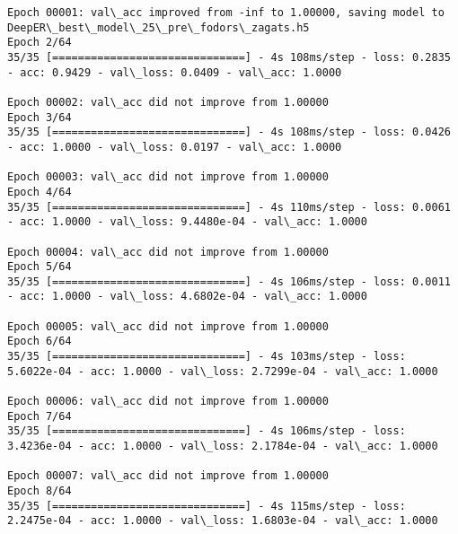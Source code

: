 \documentclass[11pt]{article}
\begin{document}
\begin{Verbatim}[commandchars=\\\{\}]
Epoch 00001: val\_acc improved from -inf to 1.00000, saving model to DeepER\_best\_model\_25\_pre\_fodors\_zagats.h5
Epoch 2/64
35/35 [==============================] - 4s 108ms/step - loss: 0.2835 - acc: 0.9429 - val\_loss: 0.0409 - val\_acc: 1.0000

Epoch 00002: val\_acc did not improve from 1.00000
Epoch 3/64
35/35 [==============================] - 4s 108ms/step - loss: 0.0426 - acc: 1.0000 - val\_loss: 0.0197 - val\_acc: 1.0000

Epoch 00003: val\_acc did not improve from 1.00000
Epoch 4/64
35/35 [==============================] - 4s 110ms/step - loss: 0.0061 - acc: 1.0000 - val\_loss: 9.4480e-04 - val\_acc: 1.0000

Epoch 00004: val\_acc did not improve from 1.00000
Epoch 5/64
35/35 [==============================] - 4s 106ms/step - loss: 0.0011 - acc: 1.0000 - val\_loss: 4.6802e-04 - val\_acc: 1.0000

Epoch 00005: val\_acc did not improve from 1.00000
Epoch 6/64
35/35 [==============================] - 4s 103ms/step - loss: 5.6022e-04 - acc: 1.0000 - val\_loss: 2.7299e-04 - val\_acc: 1.0000

Epoch 00006: val\_acc did not improve from 1.00000
Epoch 7/64
35/35 [==============================] - 4s 106ms/step - loss: 3.4236e-04 - acc: 1.0000 - val\_loss: 2.1784e-04 - val\_acc: 1.0000

Epoch 00007: val\_acc did not improve from 1.00000
Epoch 8/64
35/35 [==============================] - 4s 115ms/step - loss: 2.2475e-04 - acc: 1.0000 - val\_loss: 1.6803e-04 - val\_acc: 1.0000


\end{Verbatim}
\end{document}
